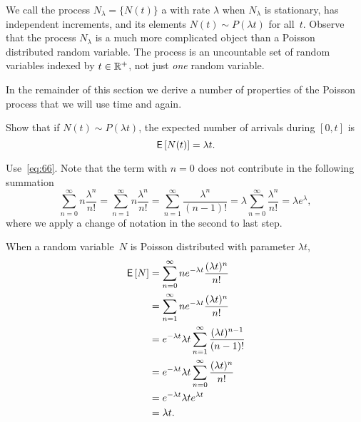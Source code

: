 We call the process $N_\lambda=\{N(t)\}$ a  with rate $\lambda$ when $N_\lambda$ is stationary, has independent increments, and its elements $N(t)\sim P(\lambda t)$ for all~$t$.
Observe that the process $N_\lambda$ is a much more complicated object than a Poisson distributed random variable.
The process is an uncountable set of random variables indexed by $t\in \mathbb{R}^+$, not just \emph{one} random variable.


In the remainder of this section we derive a number of  properties of the Poisson process that we will use time and again.

\begin{exercise}\label{ex:2}
  Show that if $N(t)\sim P(\lambda t)$, the expected number of arrivals during $[0,t]$ is
  \begin{equation*}
  \,\mathsf{E}\left[N(t)\right] = \lambda t.
  \end{equation*}
  \begin{hint}
Use~\eqref{eq:66}. Note  that the term with $n=0$ does not contribute in the following summation
\begin{equation*}
\sum_{n=0}^\infty n \frac{\lambda^n}{n!} = \sum_{n=1}^\infty n \frac{\lambda^n}{n!} = \sum_{n=1}^\infty \frac{\lambda^n}{(n-1)!} = \lambda \sum_{n=0}^\infty \frac{\lambda^n}{n!} = \lambda e^{\lambda},
\end{equation*}
where we apply a change of notation in the second to last step.
  \end{hint}
  \begin{solution} 
    When a random variable~$N$ is Poisson distributed with parameter
    $\lambda t$,
    \begin{align*}
      \,\mathsf{E}\left[N\right] 
&= \sum_{n=0}^\infty n e^{-\lambda t}\frac{(\lambda t)^n}{n!}  \\
&= \sum_{n=1}^\infty n e^{-\lambda t}\frac{(\lambda t)^n}{n!} \\ 
&= e^{-\lambda t} \lambda t \sum_{n=1}^\infty \frac{(\lambda t)^{n-1}}{(n-1)!} \\
&= e^{-\lambda t} \lambda t \sum_{n=0}^\infty \frac{(\lambda t)^{n}}{n!} \\
&= e^{-\lambda t} \lambda t e^{\lambda t} \\
&= \lambda t.
    \end{align*}
\end{solution}
\end{exercise}


